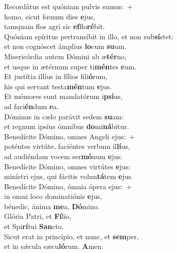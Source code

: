 \evenverse Recordátus est quóniam pulvis sumus:~+\\
\evenverse  homo, sicut fœnum dies \textbf{e}jus,~\*\\
\evenverse tamquam flos agri sic \textbf{ef}flo\textbf{ré}bit.\\
\oddverse Quóniam spíritus pertransíbit in illo, et non sub\textbf{sí}stet:~\*\\
\oddverse et non cognóscet ámplius \textbf{lo}cum \textbf{su}um.\\
\evenverse Misericórdia autem Dómini ab æ\textbf{tér}no,~\*\\
\evenverse et usque in ætérnum super ti\textbf{mén}tes \textbf{e}um.\\
\oddverse Et justítia illíus in fílios fili\textbf{ó}rum,~\*\\
\oddverse his qui servant testa\textbf{mén}tum \textbf{e}jus.\\
\evenverse Et mémores sunt mandatórum i\textbf{psí}us,~\*\\
\evenverse ad faci\textbf{én}dum \textbf{e}a.\\
\oddverse Dóminus in cælo parávit sedem \textbf{su}am:~\*\\
\oddverse et regnum ipsíus ómnibus \textbf{do}mi\textbf{ná}bitur.\\
\evenverse Benedícite Dómino, omnes Angeli ejus:~+\\
\evenverse  poténtes virtúte, faciéntes verbum il\textbf{lí}us,~\*\\
\evenverse ad audiéndam vocem ser\textbf{mó}num \textbf{e}jus.\\
\oddverse Benedícite Dómino, omnes virtútes \textbf{e}jus:~\*\\
\oddverse minístri ejus, qui fácitis volun\textbf{tá}tem \textbf{e}jus.\\
\evenverse Benedícite Dómino, ómnia ópera ejus:~+\\
\evenverse  in omni loco dominatiónis \textbf{e}jus,~\*\\
\evenverse bénedic, ánima \textbf{me}a, \textbf{Dó}mino.\\
\oddverse Glória Patri, et \textbf{Fí}lio,~\*\\
\oddverse et Spi\textbf{rí}tui \textbf{San}cto.\\
\evenverse Sicut erat in princípio, et nunc, et \textbf{sem}per,~\*\\
\evenverse et in sǽcula sæcu\textbf{ló}rum. \textbf{A}men.\\
